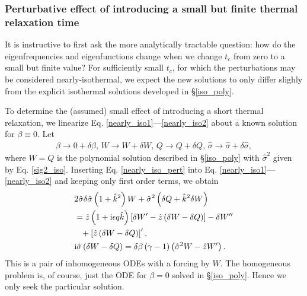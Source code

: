 \subsubsection{Perturbative effect of introducing a small but finite
  thermal relaxation time} 

It is instructive to first ask the more analytically tractable question: how
do the eigenfrequencies and eigenfunctions change when we change
$t_c$ from zero to a small but finite value? For sufficiently small
$t_c$, for which the perturbations may be considered
nearly-isothermal, we expect the new solutions to only differ slighly
from the explicit isothermal solutions developed in \S\ref{iso_poly}. 




To determine the (assumed) small effect of introducing a short thermal
relaxation, we linearize Eq. \ref{nearly_iso1}---\ref{nearly_iso2} about a known
solution for $\beta\equiv0$. Let 
\begin{align}\label{nearly_iso_pert}
  \beta \to 0 + \delta\beta,\, W\to W+\delta W,\, Q \to Q+\delta
  Q,\,\hat{\sigma} \to \hat{\sigma} + \delta\hat{\sigma}, 
\end{align} 
where $W=Q$ is the polynomial solution described in \S\ref{iso_poly}
with $\hat{\sigma}^2$ given by Eq. \ref{sig2_iso}. Inserting
Eq. \ref{nearly_iso_pert} into
Eq. \ref{nearly_iso1}---\ref{nearly_iso2} and keeping only first order
terms, we obtain
\begin{align}
  &2\hat{\sigma}\delta\hat{\sigma}\left(1+\hat{k}^2\right)W +
  \hat{\sigma}^2 \left(\delta Q + \hat{k}^2\delta W\right)\notag\\
  &= \hat{z} \left(1+\mathrm{i}\epsilon q \hat{k}\right)\left[\delta W^\prime -
    \hat{z} \left(\delta W - 
      \delta Q\right)\right] - \delta W^{\prime\prime}\notag\\
  &\phantom{=} + \left[\hat{z} \left(\delta W -
     \delta Q\right)\right]^\prime,\label{nearly_iso3}\\
&\mathrm{i}\hat{\sigma} \left(\delta W - \delta Q\right) =
\delta\beta\left(\gamma-1\right)\left(\hat{\sigma}^2W - \hat{z}W^\prime\right).\label{nearly_iso4}
\end{align}
This is a pair of inhomogeneous ODEs with a forcing by $W$. The
homogeneous problem is, of course, just the ODE for $\beta=0$ solved
in \S\ref{iso_poly}. Hence we only seek the particular solution. 

